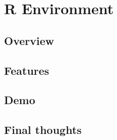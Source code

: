\chapter{R Environment}

\section{Overview}

\section{Features}

\section{Demo}

\section{Final thoughts}